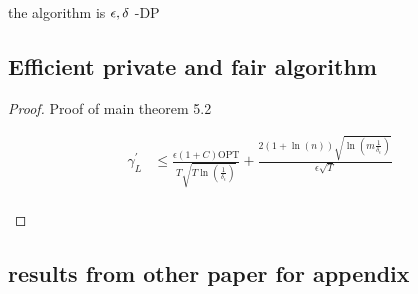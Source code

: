 \begin{theorem}
\begin{lemma}
	the algorithm is $\epsilon,\delta$ -DP 
\end{lemma}

\subsection{Efficient private and fair algorithm}


\begin{proof} Proof of main theorem 5.2

\begin{align*}
\gamma_L^\prime &\leq \frac{\epsilon(1+C)\text{OPT}}
{T\sqrt{T\ln(\frac{1}{\delta_\epsilon})}} +
\frac{2(1+\ln(n))\sqrt{\ln(m\frac{1}{\delta_\epsilon})}}{\epsilon\sqrt{T}}
\end{align*}
\\

\end{proof}

\subsection{results from other paper for appendix}


\end{theorem}

